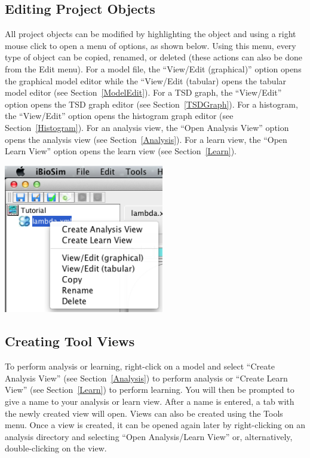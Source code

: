 \documentclass[titlepage,11pt]{article}
\begin{document}
\clearpage

\subsection{Editing Project Objects}

\noindent
All project objects can be modified by highlighting the object and using a right mouse click to open a menu of options, as shown below. Using this menu, every type of object can be copied, renamed, or deleted (these actions can also be done from the Edit menu).  For a model file, the ``View/Edit (graphical)'' option opens the graphical model editor while the ``View/Edit (tabular) opens the tabular model editor (see Section~\ref{ModelEdit}).  
For a TSD graph, the ``View/Edit'' option opens the TSD graph editor (see Section~\ref{TSDGraph}).  For a histogram, the ``View/Edit'' option opens the histogram graph editor 
(see Section~\ref{Histogram}).  
For an analysis view, the ``Open Analysis View'' option opens the analysis view (see Section~\ref{Analysis}). For a learn view, the ``Open Learn View'' option opens the learn view (see Section~\ref{Learn}).

\begin{center}
\includegraphics[height=65mm]{screenshots/GCMAnalysis} 
\end{center}

\subsection{Creating Tool Views}

\noindent
To perform analysis or learning, right-click on a model and select ``Create Analysis View'' (see Section~\ref{Analysis}) to perform analysis or ``Create Learn View'' (see Section~\ref{Learn}) to perform learning. You will then be prompted to give a name to your analysis or learn view. After a name is entered, a tab with the newly created view will open.  Views can also be created using the Tools menu.  Once a view is created, it can be opened again later by right-clicking on an analysis directory and selecting ``Open Analysis/Learn View'' or, alternatively, double-clicking on the view.
\end{document}
